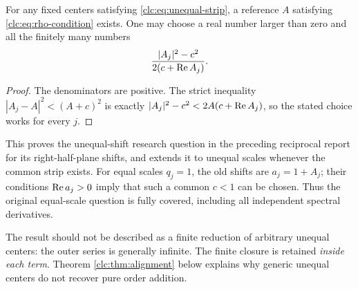 \begin{corollary}
\label{clc:cor:global-center}
For any fixed centers satisfying \eqref{clc:eq:unequal-strip}, a reference
$A$ satisfying \eqref{clc:eq:rho-condition} exists. One may choose a real
number larger than zero and all the finitely many numbers
\begin{equation}\label{clc:eq:choose-A}
 \frac{|A_j|^2-c^2}{2(c+\operatorname{Re} A_j)}.
\end{equation}
\end{corollary}
\begin{proof}
The denominators are positive. The strict inequality
$|A_j-A|^2<(A+c)^2$ is exactly
$|A_j|^2-c^2<2A(c+\operatorname{Re} A_j)$, so the stated choice works for every $j$.
\end{proof}

This proves the unequal-shift research question in the preceding
reciprocal report \cite[Further research, question 2]{RLC} for its
right-half-plane shifts, and extends it to unequal scales whenever the
common strip exists. For equal scales $q_j=1$, the old shifts are
$a_j=1+A_j$; their conditions $\operatorname{Re} a_j>0$ imply that such a common
$c<1$ can be chosen. Thus the original equal-scale question is fully
covered, including all independent spectral derivatives.

The result should not be described as a finite reduction of arbitrary
unequal centers: the outer series is generally infinite. The finite
closure is retained \emph{inside each term}. Theorem
\ref{clc:thm:alignment} below explains why generic unequal centers do
not recover pure order addition.
